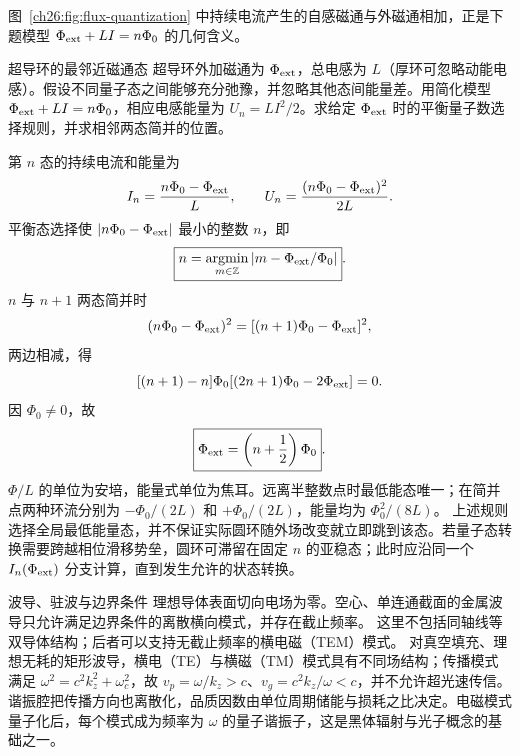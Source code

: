 \begin{center}
\label{ch26:fig:flux-quantization}
\end{center}
图~\ref{ch26:fig:flux-quantization} 中持续电流产生的自感磁通与外磁通相加，正是下题模型 $\Phi_{\rm ext}+LI=n\Phi_0$ 的几何含义。

\begin{origexamplebox}{超导环的最邻近磁通态}
超导环外加磁通为 $\Phi_{\rm ext}$，总电感为 $L$（厚环可忽略动能电感）。假设不同量子态之间能够充分弛豫，并忽略其他态间能量差。用简化模型
$\Phi_{\rm ext}+LI=n\Phi_0$，相应电感能量为 $U_n=LI^2/2$。求给定 $\Phi_{\rm ext}$ 时的平衡量子数选择规则，并求相邻两态简并的位置。
\end{origexamplebox}
\begin{xesolution}
第 $n$ 态的持续电流和能量为
\[
 I_n=\frac{n\Phi_0-\Phi_{\rm ext}}{L},
 \qquad
 U_n=\frac{(n\Phi_0-\Phi_{\rm ext})^2}{2L}.
\]
平衡态选择使 $|n\Phi_0-\Phi_{\rm ext}|$ 最小的整数 $n$，即
\[
 \boxed{n=\operatorname*{argmin}_{m\in\mathbb Z}|m-\Phi_{\rm ext}/\Phi_0|}.
\]
$n$ 与 $n+1$ 两态简并时
\[
 (n\Phi_0-\Phi_{\rm ext})^2=[(n+1)\Phi_0-\Phi_{\rm ext}]^2,
\]
两边相减，得
\[
 [(n+1)-n]\Phi_0[(2n+1)\Phi_0-2\Phi_{\rm ext}]=0.
\]
因 $\Phi_0\ne0$，故
\[
 \boxed{\Phi_{\rm ext}=\left(n+\frac12\right)\Phi_0}.
\]
$\Phi/L$ 的单位为安培，能量式单位为焦耳。远离半整数点时最低能态唯一；在简并点两种环流分别为 $-\Phi_0/(2L)$ 和 $+\Phi_0/(2L)$，能量均为 $\Phi_0^2/(8L)$。
上述规则选择全局最低能量态，并不保证实际圆环随外场改变就立即跳到该态。若量子态转换需要跨越相位滑移势垒，圆环可滞留在固定 $n$ 的亚稳态；此时应沿同一个 $I_n(\Phi_{\rm ext})$ 分支计算，直到发生允许的状态转换。
\end{xesolution}

\begin{starread}{波导、驻波与边界条件}
理想导体表面切向电场为零。空心、单连通截面的金属波导只允许满足边界条件的离散横向模式，并存在截止频率。
这里不包括同轴线等双导体结构；后者可以支持无截止频率的横电磁（TEM）模式。
对真空填充、理想无耗的矩形波导，横电（TE）与横磁（TM）模式具有不同场结构；传播模式满足 $\omega^2=c^2k_z^2+\omega_c^2$，故 $v_p=\omega/k_z>c$、$v_g=c^2k_z/\omega<c$，并不允许超光速传信。
谐振腔把传播方向也离散化，品质因数由单位周期储能与损耗之比决定。电磁模式量子化后，每个模式成为频率为
$\omega$ 的量子谐振子，这是黑体辐射与光子概念的基础之一。
\end{starread}
